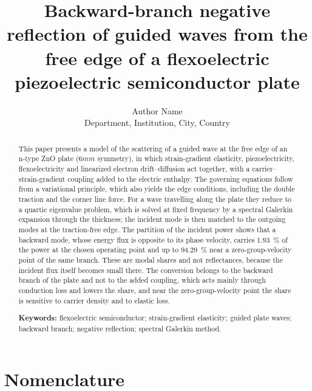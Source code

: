\documentclass[12pt,a4paper]{article}
\title{\bfseries Backward-branch negative reflection of guided waves from the
free edge of a flexoelectric piezoelectric semiconductor plate}
\author{Author Name\\[2pt]
\small Department, Institution, City, Country}
\date{}
\begin{document}
\maketitle

\begin{abstract}
\noindent
This paper presents a model of the scattering of a guided wave at the free edge of an n-type ZnO plate ($6mm$ symmetry), in which strain-gradient elasticity, piezoelectricity, flexoelectricity and linearized electron drift--diffusion act together, with a carrier--strain-gradient coupling added to the electric enthalpy.  The governing equations follow from a variational principle, which also yields the edge conditions, including the double traction and the corner line force.  For a wave travelling along the plate they reduce to a quartic eigenvalue problem, which is solved at fixed frequency by a spectral Galerkin expansion through the thickness; the incident mode is then matched to the outgoing modes at the traction-free edge.  The partition of the incident power shows that a backward mode, whose energy flux is opposite to its phase velocity, carries \SI{1.93}{\percent} of the power at the chosen operating point and up to \SI{94.29}{\percent} near a zero-group-velocity point of the same branch.  These are modal shares and not reflectances, because the incident flux itself becomes small there.  The conversion belongs to the backward branch of the plate and not to the added coupling, which acts mainly through conduction loss and lowers the share, and near the zero-group-velocity point the share is sensitive to carrier density and to elastic loss.

\medskip
\noindent\textbf{Keywords:} flexoelectric semiconductor; strain-gradient
elasticity; guided plate waves; backward branch; negative reflection; spectral
Galerkin method.
\end{abstract}

\section*{Nomenclature}
\end{document}
